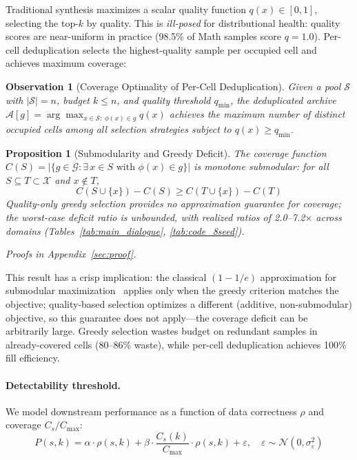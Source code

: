 \documentclass{article}
\theoremstyle{plain}
\newtheorem{observation}{Observation}
\newtheorem{proposition}{Proposition}
\theoremstyle{remark}
\begin{document}
Traditional synthesis maximizes a scalar quality function $q(x) \in [0,1]$, selecting the top-$k$ by quality.
This is \emph{ill-posed} for distributional health: quality scores are near-uniform in practice (98.5\% of Math samples score $q{=}1.0$).
Per-cell deduplication selects the highest-quality sample per occupied cell and achieves maximum coverage:

\begin{observation}[Coverage Optimality of Per-Cell Deduplication]
\label{prop:optimal}
Given a pool $\mathcal{S}$ with $|\mathcal{S}| = n$, budget $k \leq n$, and quality threshold $q_{\min}$, the deduplicated archive $\mathcal{A}[g] = \arg\max_{x \in \mathcal{S}:\; \phi(x) \in g} q(x)$ achieves the maximum number of distinct occupied cells among all selection strategies subject to $q(x) \geq q_{\min}$.
\end{observation}

\begin{proposition}[Submodularity and Greedy Deficit]
\label{prop:submodular}
The coverage function $C(S) = |\{g \in \mathcal{G} : \exists\, x \in S \text{ with } \phi(x) \in g\}|$ is monotone submodular: for all $S \subseteq T \subset \mathcal{X}$ and $x \notin T$,
\begin{equation}
C(S \cup \{x\}) - C(S) \geq C(T \cup \{x\}) - C(T)
\label{eq:submodular}
\end{equation}
Quality-only greedy selection provides no approximation guarantee for coverage; the worst-case deficit ratio is unbounded, with realized ratios of 2.0--7.2$\times$ across domains (Tables~\ref{tab:main_dialogue}, \ref{tab:code_8seed}).
\end{proposition}

\emph{Proofs in Appendix~\ref{sec:proof}.}

This result has a crisp implication: the classical $(1{-}1/e)$ approximation for submodular maximization~\citep{nemhauser1978analysis} applies only when the greedy criterion matches the objective; quality-based selection optimizes a different (additive, non-submodular) objective, so this guarantee does not apply---the coverage deficit can be arbitrarily large.
Greedy selection wastes budget on redundant samples in already-covered cells (80--86\% waste), while per-cell deduplication achieves 100\% fill efficiency.


\paragraph{Detectability threshold.}
We model downstream performance as a function of data correctness $\rho$ and coverage $C_s/C_{\max}$:
\begin{equation}
P(s,k) = \alpha \cdot \rho(s,k) + \beta \cdot \frac{C_s(k)}{C_{\max}} \cdot \rho(s,k) + \varepsilon, \quad \varepsilon \sim \mathcal{N}(0, \sigma^2_\varepsilon)
\label{eq:performance}
\end{equation}
\end{document}
